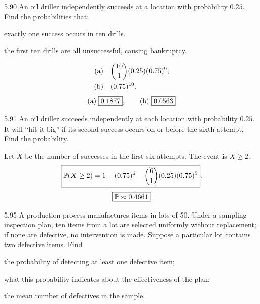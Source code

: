 \documentclass[11pt,oneside]{article}
\begin{document}
\begin{exercise}{5.90}
An oil driller independently succeeds at a location with probability $0.25$. Find the probabilities that:
\begin{exercisesubparts}
\item exactly one success occurs in ten drills.
\item the first ten drills are all unsuccessful, causing bankruptcy.
\end{exercisesubparts}
\end{exercise}

\begin{solution}
\begin{align*}
\textup{(a)}\quad&\binom{10}{1}(0.25)(0.75)^9,\\
\textup{(b)}\quad&(0.75)^{10}.
\end{align*}
\[
\textup{(a)}\;\boxed{0.1877},\qquad \textup{(b)}\;\boxed{0.0563}
\]
\end{solution}

\begin{exercise}{5.91}
An oil driller succeeds independently at each location with probability $0.25$. It will ``hit it big'' if its second success occurs on or before the sixth attempt. Find the probability.
\end{exercise}

\begin{solution}
Let $X$ be the number of successes in the first six attempts. The event is $X\ge2$:
\[
\boxed{\mathbb{P}(X\ge2)=1-(0.75)^6-\binom{6}{1}(0.25)(0.75)^5}.
\]
\[
\boxed{\mathbb{P}\approx 0.4661}
\]
\end{solution}

\begin{exercise}{5.95}
A production process manufactures items in lots of 50. Under a sampling inspection plan, ten items from a lot are selected uniformly without replacement; if none are defective, no intervention is made. Suppose a particular lot contains two defective items. Find
\par
\begin{exercisesubparts}
\item the probability of detecting at least one defective item;
\item what this probability indicates about the effectiveness of the plan;
\item the mean number of defectives in the sample.
\end{exercisesubparts}
\end{exercise}
\end{document}
